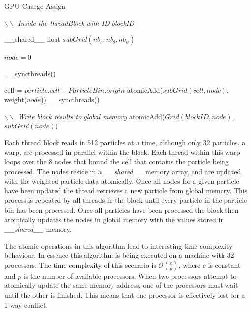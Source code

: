 \begin{algorithm}
	\caption{GPU Charge Assign}
	\label{alg:gpu_c2mesh}
	\begin{algorithmic}
			\STATE \emph{$\backslash \backslash$ Inside the threadBlock with ID blockID}

			\STATE \_\_shared\_\_ float $subGrid(nb_r,nb_{\theta},nb_{\psi})$

			\STATE $node = 0$
			\ENDFOR
			
			\STATE \_\_syncthreads()
			

				\STATE cell = $particle.cell - ParticleBin.origin$
					\STATE atomicAdd($subGrid(cell,node)$, weight($node$))
				\ENDFOR
			\ENDFOR
			\STATE \_\_syncthreads()

			\STATE \emph{$\backslash \backslash$ Write block results to global memory}
				\STATE atomicAdd($Grid(blockID,node)$, $subGrid(node)$)
			\ENDFOR
			
		\ENDFOR
	\end{algorithmic}
\end{algorithm}

Each thread block reads in 512 particles at a time, although only 32 particles, a warp, are processed in parallel within the block. Each thread within this warp loops over the 8 nodes that bound the cell that contains the particle being processed. The nodes reside in a \emph{\_\_shared\_\_} memory array, and are updated with the weighted particle data atomically. Once all nodes for a given particle have been updated the thread retrieves a new particle from global memory. This process is repeated by all threads in the block until every particle in the particle bin has been processed. Once all particles have been processed the block then atomically updates the nodes in global memory with the values stored in \emph{\_\_shared\_\_} memory.  

The atomic operations in this algorithm lead to interesting time complexity behaviour. In essence this algorithm is being executed on a machine with 32 processors. The time complexity of this scenario is $\mathcal{O}(\frac{c}{p})$, where $c$ is constant and $p$ is the number of available processors. When two processors attempt to atomically update the same memory address, one of the processors must wait until the other is finished. This means that one processor is effectively lost for a 1-way conflict. 

